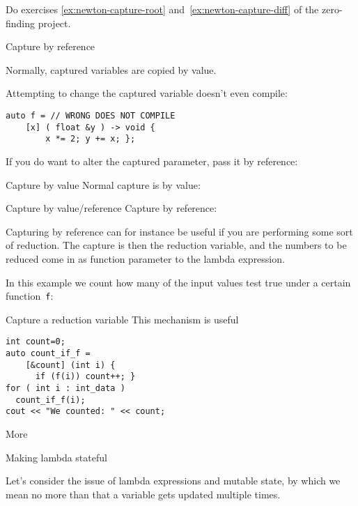 \begin{exercise}
  Do exercises \ref{ex:newton-capture-root} and~\ref{ex:newton-capture-diff}
  of the zero-finding project.
\end{exercise}

 {Capture by reference}

Normally, captured variables are copied by value.

Attempting to change the captured variable doesn't even compile:
\begin{lstlisting}
auto f = // WRONG DOES NOT COMPILE
    [x] ( float &y ) -> void {
        x *= 2; y += x; };
\end{lstlisting}

If you do want to alter the captured parameter,
pass it by reference:

\begin{slide}{Capture by value}
  \label{sl:lambda-val-val}
Normal capture is by value:
\end{slide}

\begin{slide}{Capture by value/reference}
  \label{sl:lambda-ref-ref}
  Capture by reference:
\end{slide}

Capturing by reference can for instance be useful
if you are performing some sort of reduction.
The capture is then the reduction variable,
and the numbers to be reduced come in as function parameter
to the lambda expression.

In this example we count how many of the input values
test true under a certain function~\lstinline{f}:

\begin{block}{Capture a reduction variable}
  \label{sl:capture-count}
This mechanism is useful 
\begin{lstlisting}
int count=0;
auto count_if_f = 
    [&count] (int i) {
      if (f(i)) count++; }
for ( int i : int_data )
  count_if_f(i);
cout << "We counted: " << count;
\end{lstlisting}
\end{block}

 {More}

 {Making lambda stateful}

Let's consider the issue of lambda expressions and mutable state,
by which we mean no more than that a variable gets updated
multiple times.


